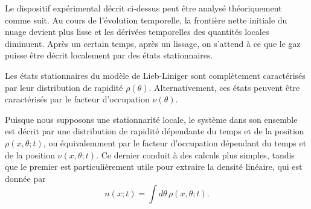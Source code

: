 Le dispositif expérimental décrit ci-dessus peut être analysé théoriquement comme suit. Au cours de l'évolution temporelle, la frontière nette initiale du nuage devient plus lisse et les dérivées temporelles des quantités locales diminuent. Après un certain temps, après un lissage, on s'attend à ce que le gaz puisse être décrit localement par des états stationnaires.

Les états stationnaires du modèle de Lieb-Liniger sont complètement caractérisés par leur distribution de rapidité $\rho(\theta)$. Alternativement, ces états peuvent être caractérisés par le facteur d'occupation $\nu(\theta)$.%

Puisque nous supposons une stationnarité locale, le système dans son ensemble est décrit par une distribution de rapidité dépendante du temps et de la position $\rho(x,\theta ; t )$, ou équivalemment par le facteur d'occupation dépendant du temps et de la position $\nu(x,\theta ; t)$. Ce dernier conduit à des calculs plus simples, tandis que le premier est particulièrement utile pour extraire la densité linéaire, qui est donnée par
\begin{equation}
    \label{eq:lineardensity}
	n(x;t) = \int d\theta \, \rho(x,\theta ; t ) .
\end{equation}

